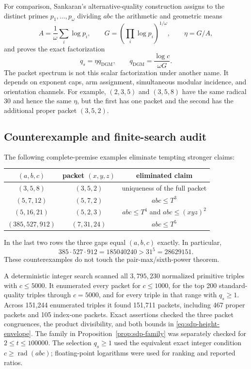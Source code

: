 For comparison, Sankaran's alternative-quality construction
\cite{Sankaran2026AlternativeQuality} assigns to the distinct primes
$p_1,\ldots,p_\omega$ dividing $abc$ the arithmetic and geometric means
\[
 A=\frac1\omega\sum_i\log p_i,
 \qquad
 G=\left(\prod_i\log p_i\right)^{1/\omega},
 \qquad
 \eta=G/A,
\]
and proves the exact factorization
\[
 q_s=\eta q_{\mathrm{DGM}},
 \qquad
 q_{\mathrm{DGM}}=\frac{\log c}{\omega G}.
\]
The packet spectrum is not this scalar factorization under another name.
It depends on exponent caps, arm assignment, simultaneous modular incidence,
and orientation channels.  For example, $(2,3,5)$ and $(3,5,8)$ have the
same radical $30$ and hence the same $\eta$, but the first has one packet
and the second has the additional proper packet $(3,5,2)$.

\subsection{Counterexample and finite-search audit}

The following complete-premise examples eliminate tempting stronger claims:
\begin{center}
\begin{tabular}{c|c|c}
$(a,b,c)$ & packet $(x,y,z)$ & eliminated claim\\ \hline
$(3,5,8)$ & $(3,5,2)$ & uniqueness of the full packet\\
$(5,7,12)$ & $(5,7,2)$ & $abc\le T^3$\\
$(5,16,21)$ & $(5,2,3)$ & $abc\le T^4$ and $abc\le(xyz)^2$\\
$(385,527,912)$ & $(7,31,24)$ & $abc\le T^5$
\end{tabular}
\end{center}
In the last two rows the three gaps equal $(a,b,c)$ exactly.  In particular,
\[
 385\cdot527\cdot912=185040240>31^5=28629151.
\]
These counterexamples do not touch the pair-max/sixth-power theorem.

A deterministic integer search scanned all $3{,}795{,}230$ normalized
primitive triples with $c\le5000$.  It enumerated every packet for
$c\le1000$, for the top 200 standard-quality triples through $c=5000$, and
for every triple in that range with $q_s\ge1$.  Across 151,244 enumerated
triples it found 151,711 packets, including 467 proper packets and 105
index-one packets.  Exact assertions checked the three packet congruences,
the product divisibility, and both bounds in
\eqref{eq:sdp-height-envelope}.  The family in
Proposition~\ref{prop:sdp-family} was separately checked for
$2\le t\le100000$.  The selection $q_s\ge1$ used the equivalent exact
integer condition $c\ge\operatorname{rad}(abc)$; floating-point logarithms
were used for ranking and reported ratios.

